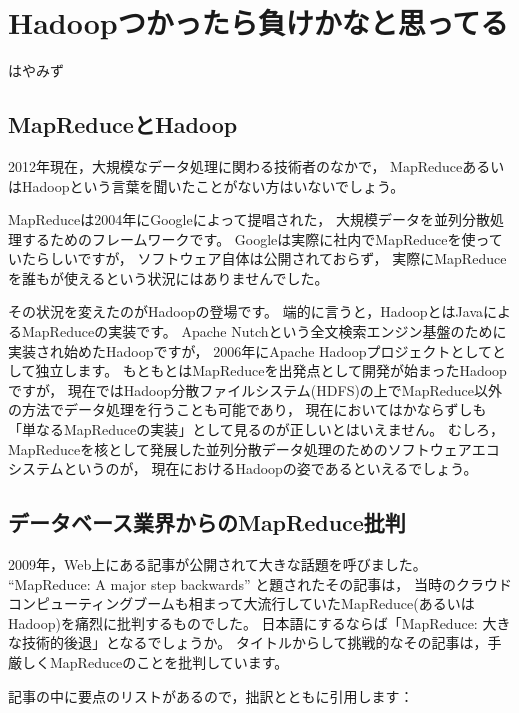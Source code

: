 
\chapter{Hadoopつかったら負けかなと思ってる}

\begin{flushright}
 {\headfont はやみず}
\end{flushright}

\section{MapReduceとHadoop}

2012年現在，大規模なデータ処理に関わる技術者のなかで，
MapReduceあるいはHadoopという言葉を聞いたことがない方はいないでしょう。

MapReduceは2004年にGoogleによって提唱された，
大規模データを並列分散処理するためのフレームワークです。
Googleは実際に社内でMapReduceを使っていたらしいですが，
ソフトウェア自体は公開されておらず，
実際にMapReduceを誰もが使えるという状況にはありませんでした。

その状況を変えたのがHadoopの登場です。
端的に言うと，HadoopとはJavaによるMapReduceの実装です。
Apache Nutchという全文検索エンジン基盤のために実装され始めたHadoopですが，
2006年にApache Hadoopプロジェクトとしてとして独立します。
もともとはMapReduceを出発点として開発が始まったHadoopですが，
現在ではHadoop分散ファイルシステム(HDFS)の上でMapReduce以外の方法でデータ処理を行うことも可能であり，
現在においてはかならずしも「単なるMapReduceの実装」として見るのが正しいとはいえません。
むしろ，MapReduceを核として発展した並列分散データ処理のためのソフトウェアエコシステムというのが，
現在におけるHadoopの姿であるといえるでしょう。

\section{データベース業界からのMapReduce批判}

2009年，Web上にある記事が公開されて大きな話題を呼びました。
``MapReduce: A major step backwards'' と題されたその記事は，
当時のクラウドコンピューティングブームも相まって大流行していたMapReduce(あるいはHadoop)を痛烈に批判するものでした。
日本語にするならば「MapReduce: 大きな技術的後退」となるでしょうか。
タイトルからして挑戦的なその記事は，手厳しくMapReduceのことを批判しています。

記事の中に要点のリストがあるので，拙訳とともに引用します：

